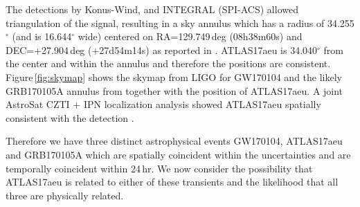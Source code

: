 \documentclass[twocolumn]{aastex61}
\begin{document}
The detections by Konus-Wind, and INTEGRAL (SPI-ACS) allowed triangulation of the signal, resulting in a sky annulus which has a radius of 34.255$^{\circ}$  (and is 16.644$^{\circ}$ wide) centered on  RA=129.749\,deg (08h38m60s) and DEC=+27.904\,deg (+27d54m14s) as reported in \cite{GCN20406}. ATLAS17aeu is 34.040$^{\circ}$ from the center and within the annulus and therefore the positions are consistent.  
Figure\,\ref{fig:skymap} shows the skymap from LIGO for GW170104 and the likely GRB170105A 
annulus from \citep{GCN20406} together with the position of ATLAS17aeu. 
A joint AstroSat CZTI
+ IPN localization analysis showed ATLAS17aeu spatially consistent with the detection \citep{2017arXiv170600024B}. 

Therefore we have three distinct astrophysical events GW170104, ATLAS17aeu and 
GRB170105A which are spatially coincident within the uncertainties and are 
temporally coincident within 24\,hr.  We now consider the possibility that 
ATLAS17aeu is related to either of these transients and the likelihood that all three are physically related. 
\end{document}
